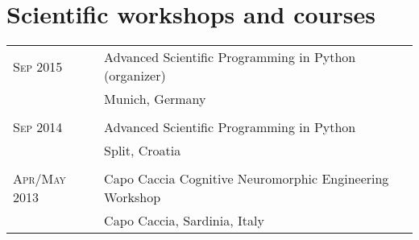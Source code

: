 \documentclass[a4paper,10pt]{article}
\begin{document}
\section{Scientific workshops and courses}
\begin{tabular}{>{\hfill}p{3.15cm}|p{10.4cm}}
  \textsc{Sep} 2015 & Advanced Scientific Programming in Python (organizer)\\
  &  \footnotesize Munich, Germany \\
  \multicolumn{2}{c}{} \\
  \textsc{Sep} 2014 & Advanced Scientific Programming in Python \\
  &  \footnotesize Split, Croatia \\
  \multicolumn{2}{c}{} \\
  \textsc{Apr}/\textsc{May} 2013 & Capo Caccia Cognitive Neuromorphic Engineering Workshop \\
  & \footnotesize Capo Caccia, Sardinia, Italy
\end{tabular}
\end{document}
